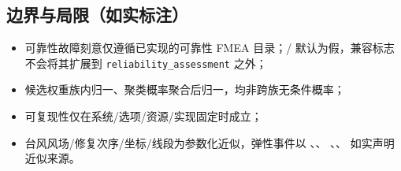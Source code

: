 \documentclass[UTF8,fontset=fandol,a4paper,11pt]{ctexart}
\begin{document}
\subsection{边界与局限（如实标注）}
\begin{itemize}
  \item 可靠性故障刻意仅遵循已实现的可靠性 FMEA 目录；/
         默认为假，兼容标志不会将其扩展到
        \texttt{reliability\_assessment} 之外；
  \item 候选权重族内归一、聚类概率聚合后归一，均非跨族无条件概率；
  \item 可复现性仅在系统/选项/资源/实现固定时成立；
  \item 台风风场/修复次序/坐标/线段为参数化近似，弹性事件以
        、、
        、、
         如实声明近似来源。
\end{itemize}

\end{document}
